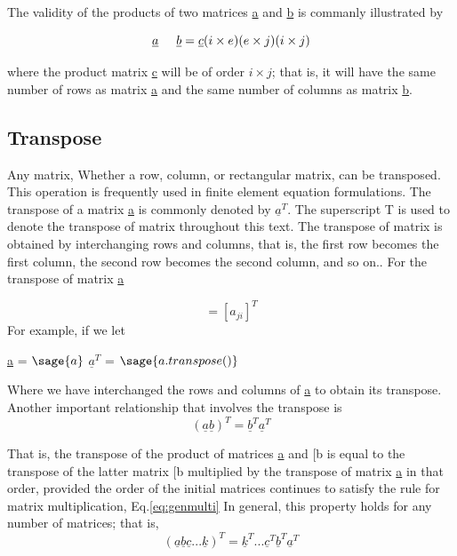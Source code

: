 \documentclass[12pt]{report}
\newcommand{\gen}[1]{
[#1_{{ij}}]
}
\newcommand{\lab}[1]{
Eq.\ref{#1}
}
\begin{document}
The validity of the products of two matrices \underline{a} and
\underline{b} is commanly illustrated by

\begin{equation} \underline{a} \hspace{0.5cm} \underline{b} = \underline{c} \nonumber \\(i \times e)(e \times j) (i \times j) \label{eq:genmulti}
\end{equation}

where the product matrix \underline{c} will be of order $i \times j$;
that is, it will have the same number of rows as matrix \underline{a}
and the same number of columns as matrix \underline{b}.

\subsection{Transpose}
Any matrix, Whether a row, column, or rectangular matrix, can be
transposed. This operation is frequently used in finite element
equation formulations. The transpose of a matrix \underline{a} is
commonly denoted by $\underline{a}^T$. The superscript T is used to
denote the transpose of matrix throughout this text. The transpose of
matrix is obtained by interchanging rows and columns, that is, the
first row becomes the first column, the second row becomes the second
column, and so on.. For the transpose of matrix \underline{a}

\begin{equation}\gen{a} =[a_{{ji}}]^T \end{equation}
For example, if we let
\begin{center}
\underline{a} = $\sage{a}$
$\underline{a}^T$ = $\sage{a.transpose()}$
\end{center}

Where we have interchanged the rows and columns of \underline{a} to
obtain its transpose.
Another important relationship that involves the
transpose is
\begin{equation} (\underline{a}\underline{b})^T = \underline{b}^T \underline{a}^T \label{eq:transpose}
\end{equation}

That is, the transpose of the product of matrices \underline{a} and
[b is equal to the transpose of the latter matrix
[b multiplied by the transpose of matrix \underline{a} in
that order, provided the order of the initial matrices continues to
satisfy the rule for matrix multiplication,\lab{eq:genmulti} In general,
this property holds for any number of matrices; that is,
\begin{equation}(\underline{a}\underline{b}\underline{c}...\underline{k})^T = \underline{k}^T... \underline{c}^T\underline{b}^T\underline{a}^T \end{equation} 
\end{document}
